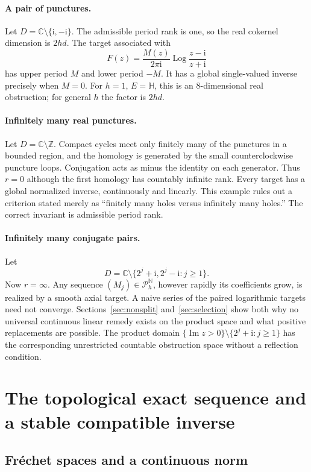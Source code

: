 \documentclass[11pt,a4paper]{article}
\numberwithin{equation}{section}
\theoremstyle{definition}
\theoremstyle{remark}
\newcommand{\C}{\mathbb C}
\newcommand{\N}{\mathbb N}
\newcommand{\Z}{\mathbb Z}
\newcommand{\ii}{\mathrm i}
\newcommand{\HH}{\mathbb H}
\newcommand{\Pspace}{\mathscr P_h}
\begin{document}
\paragraph{A pair of punctures.}
Let $D=\C\setminus\{\ii,-\ii\}$. The admissible period rank is one, so the
real cokernel dimension is $2hd$. The target associated with
\[
 F(z)=\frac{M(z)}{2\pi\ii}\operatorname{Log}\frac{z-\ii}{z+\ii}
\]
has upper period $M$ and lower period $-M$. It has a global single-valued
inverse precisely when $M=0$. For $h=1$, $E=\HH$, this is an
$8$-dimensional real obstruction; for general $h$ the factor is $2hd$.

\paragraph{Infinitely many real punctures.}
Let $D=\C\setminus\Z$. Compact cycles meet only finitely many of the
punctures in a bounded region, and the homology is generated by the small
counterclockwise puncture loops. Conjugation acts as minus the identity on
each generator. Thus $r=0$ although the first homology has countably infinite
rank. Every target has a global normalized inverse, continuously and linearly.
This example rules out a criterion stated merely as ``finitely many holes
versus infinitely many holes.'' The correct invariant is admissible period
rank.

\paragraph{Infinitely many conjugate pairs.}
Let
\[
 D=\C\setminus\{2^j+\ii,2^j-\ii:j\ge1\}.
\]
Now $r=\infty$. Any sequence $(M_j)\in\Pspace^\N$, however rapidly its
coefficients grow, is realized by a smooth axial target. A naive series of
the paired logarithmic targets need not converge. Sections~\ref{sec:nonsplit}
and~\ref{sec:selection} show both why no universal continuous linear remedy
exists on the product space and what positive replacements are possible.
The product domain $\{\operatorname{Im}z>0\}\setminus\{2^j+\ii:j\ge1\}$
has the corresponding unrestricted countable obstruction space without a
reflection condition.

\section{The topological exact sequence and a stable compatible inverse}
\label{sec:topology}

\subsection{Fr\'echet spaces and a continuous norm}
\end{document}
